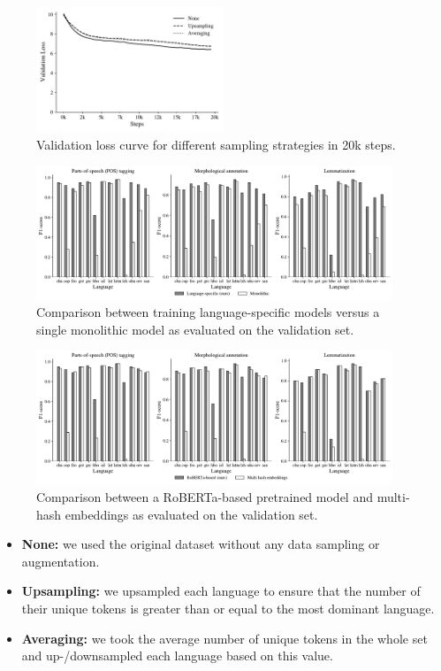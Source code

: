 \documentclass[11pt]{article}
\begin{document}
\begin{figure}[t]
  \centering
  \includegraphics[width=0.5\textwidth]{figures/effect_sampling.pdf}
  \caption{Validation loss curve for different sampling strategies in 20k steps.}
  \label{fig:effect_sampling}
\end{figure}


\begin{figure}[t]
  \centering
  \includegraphics[width=0.95\textwidth]{figures/monolithic.pdf}
  \caption{Comparison between training language-specific models versus a single monolithic model as evaluated on the validation set.}
  \label{fig:monolithic}
\end{figure}

\begin{figure}[t]
  \centering
  \includegraphics[width=0.95\textwidth]{figures/hashembed.pdf}
  \caption{Comparison between a RoBERTa-based pretrained model and multi-hash embeddings \cite{miranda-etal-2022-multi} as evaluated on the validation set.}
  \label{fig:hashembed}
\end{figure}


\begin{itemize}
  \item \textbf{None:} we used the original dataset without any data sampling or augmentation.
  \item \textbf{Upsampling:} we upsampled each language to ensure that the number of their unique tokens is greater than or equal to the most dominant language.
  \item \textbf{Averaging:} we took the average number of unique tokens in the whole set and up-/downsampled each language based on this value.
\end{itemize}
\end{document}
